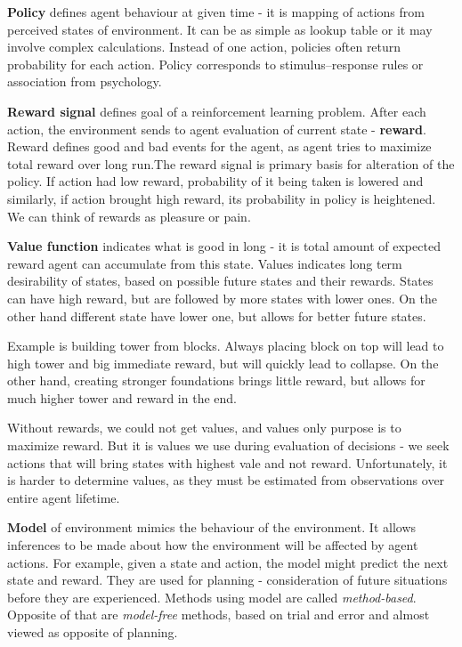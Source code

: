 \textbf{Policy} defines agent behaviour at given time - it is mapping of actions from perceived states of environment. It can be as simple as lookup table or it may involve complex calculations. Instead of one action, policies often return probability for each action. Policy corresponds to stimulus–response rules or association from psychology.\cite{RL}

\textbf{Reward signal} defines goal of a reinforcement learning problem. After each action, the environment sends to agent evaluation of current state - \textbf{reward}. Reward defines good and bad events for the agent, as agent tries to maximize total reward over long run.The reward signal is primary basis for alteration of the policy. If action had low reward, probability of it being taken is lowered and similarly, if action brought high reward, its probability in policy is heightened. We can think of rewards as pleasure or pain.\cite{RL}

\textbf{Value function} indicates what is good in long - it is total amount of expected reward agent can  accumulate from this state. Values indicates long term desirability of states, based on possible future states and their rewards. States can have high reward, but are followed by more states with lower ones. On the other hand different state have lower one, but allows for better future states. 

Example is building tower from blocks. Always placing block on top will lead to high tower and big immediate reward, but will quickly lead to collapse. On the other hand, creating stronger foundations brings little reward, but allows for much higher tower and reward in the end.

Without rewards, we could not get values, and values only purpose is to maximize reward. But it is values we use during evaluation of decisions - we seek actions that will bring states with highest vale and not reward. Unfortunately, it is harder to determine values, as they must be estimated from observations over entire agent lifetime.\cite{RL}

\textbf{Model} of environment mimics the behaviour of the environment. It allows inferences to be made about how the environment will be affected by agent actions. For example, given a state and action, the model might predict the next state and reward. They are used for planning - consideration of future situations before they are experienced. Methods using model are called \textit{method-based}. Opposite of that are \textit{model-free} methods, based on trial and error and almost viewed as opposite of planning.\cite{RL}

